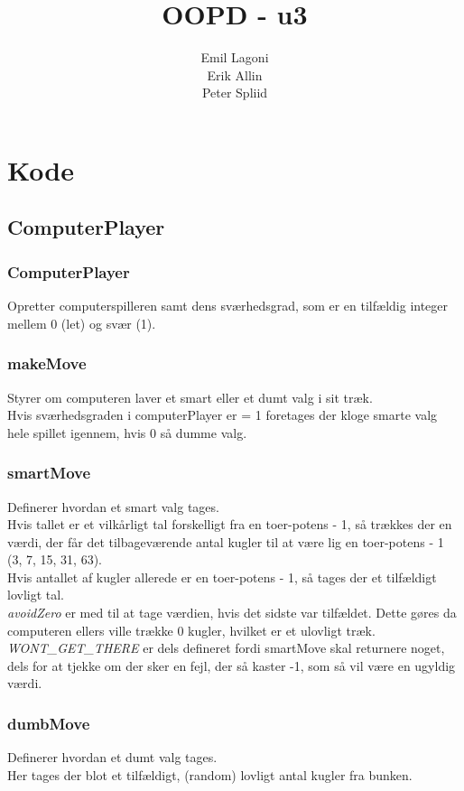 \documentclass[a4paper,11pt]{article}
\title{\textbf{OOPD - u3}}
\author{Emil Lagoni\\Erik Allin\\Peter Spliid}
\begin{document}
\maketitle
\section*{Kode}
\subsection*{ComputerPlayer}
\subsubsection*{ComputerPlayer}
Opretter computerspilleren samt dens sværhedsgrad, som er en tilfældig integer mellem 0 (let) og svær (1).

\subsubsection*{makeMove}
Styrer om computeren laver et smart eller et dumt valg i sit træk. \\
Hvis sværhedsgraden i computerPlayer er = 1 foretages der kloge smarte valg hele spillet igennem, hvis 0 så dumme valg.


\subsubsection*{smartMove}
Definerer hvordan et smart valg tages. \\
Hvis tallet er et vilkårligt tal forskelligt fra en toer-potens - 1, så trækkes der en værdi, der får det tilbageværende antal kugler til at være lig en toer-potens - 1 (3, 7, 15, 31, 63). \\
Hvis antallet af kugler allerede er en toer-potens - 1, så tages der et tilfældigt lovligt tal. \\[5px]
\textit{avoidZero} er med til at tage værdien, hvis det sidste var tilfældet. Dette gøres da computeren ellers ville trække 0 kugler, hvilket er et ulovligt træk. \\[5px]
\textit{WONT\_GET\_THERE} er dels defineret fordi smartMove skal returnere noget, dels for at tjekke om der sker en fejl, der så kaster -1, som så vil være en ugyldig værdi.


\subsubsection*{dumbMove}
Definerer hvordan et dumt valg tages. \\
Her tages der blot et tilfældigt, (random) lovligt antal kugler fra bunken.
\end{document}
